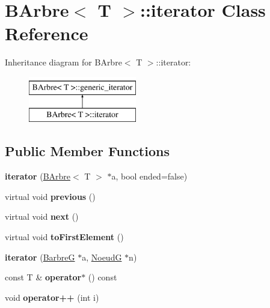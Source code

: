 \hypertarget{classBArbre_1_1iterator}{
\section{BArbre$<$ T $>$::iterator Class Reference}
\label{classBArbre_1_1iterator}
}
Inheritance diagram for BArbre$<$ T $>$::iterator:\begin{figure}[H]
\begin{center}
\leavevmode
\includegraphics[height=2.000000cm]{classBArbre_1_1iterator}
\end{center}
\end{figure}
\subsection*{Public Member Functions}
\begin{DoxyCompactItemize}
\item 
\hypertarget{classBArbre_1_1iterator_adf85f21458befaef3c185047e25c2d8b}{
{\bfseries iterator} (\hyperlink{classBArbre}{BArbre}$<$ T $>$ $\ast$a, bool ended=false)}
\label{classBArbre_1_1iterator_adf85f21458befaef3c185047e25c2d8b}

\item 
\hypertarget{classBArbre_1_1iterator_add128dc1221f82dc5438be9fba6e7375}{
virtual void {\bfseries previous} ()}
\label{classBArbre_1_1iterator_add128dc1221f82dc5438be9fba6e7375}

\item 
\hypertarget{classBArbre_1_1iterator_ad311970e22af2f3ac601a2411546e109}{
virtual void {\bfseries next} ()}
\label{classBArbre_1_1iterator_ad311970e22af2f3ac601a2411546e109}

\item 
\hypertarget{classBArbre_1_1iterator_a88e263613e498505517be010fab57132}{
virtual void {\bfseries toFirstElement} ()}
\label{classBArbre_1_1iterator_a88e263613e498505517be010fab57132}

\item 
\hypertarget{classBArbre_1_1iterator_a35d2d27919a4cd5005290c7b1270155f}{
{\bfseries iterator} (\hyperlink{classBArbre}{BarbreG} $\ast$a, \hyperlink{classNoeud}{NoeudG} $\ast$n)}
\label{classBArbre_1_1iterator_a35d2d27919a4cd5005290c7b1270155f}

\item 
\hypertarget{classBArbre_1_1iterator_a0308ab6a130eb44d6172f43d4665c333}{
const T \& {\bfseries operator$\ast$} () const }
\label{classBArbre_1_1iterator_a0308ab6a130eb44d6172f43d4665c333}

\item 
\hypertarget{classBArbre_1_1iterator_a4c386a507353fe56911bf81d0a577db6}{
void {\bfseries operator++} (int i)}
\label{classBArbre_1_1iterator_a4c386a507353fe56911bf81d0a577db6}

\end{DoxyCompactItemize}
